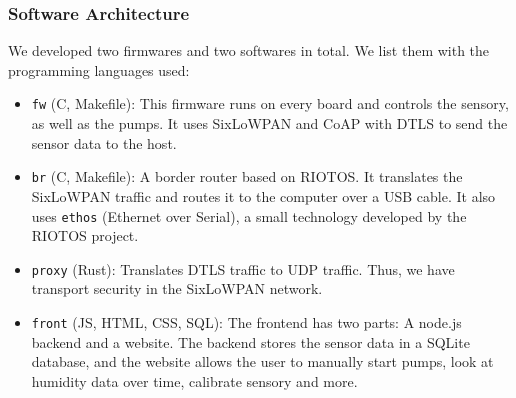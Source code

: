 \documentclass[10pt, xcolor=svgnames]{beamer}
\begin{document}
\begin{frame}
    \frametitle{Software Architecture}

    We developed two firmwares and two softwares in total. We list them with the programming languages used:

    \begin{itemize}
        \item \texttt{fw} (C, Makefile): This firmware runs on every board and controls the sensory, as well as the pumps. It uses SixLoWPAN and CoAP with DTLS to send the sensor data to the host.
        \item \texttt{br} (C, Makefile): A border router based on RIOTOS. It translates the SixLoWPAN traffic and routes it to the computer over a USB cable. It also uses \texttt{ethos} (Ethernet over Serial), a small technology developed by the RIOTOS project.
        \item \texttt{proxy} (Rust): Translates DTLS traffic to UDP traffic. Thus, we have transport security in the SixLoWPAN network.
        \item \texttt{front} (JS, HTML, CSS, SQL): The frontend has two parts: A node.js backend and a website. The backend stores the sensor data in a SQLite database, and the website allows the user to manually start pumps, look at humidity data over time, calibrate sensory and more.
    \end{itemize}
\end{frame}
\end{document}
